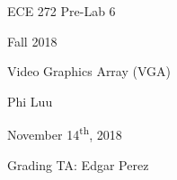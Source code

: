 \documentclass[12pt]{article}
\begin{document}
\begin{titlepage}
  \begin{center} \LARGE
    \vspace*{1.5in}

    ECE 272 Pre-Lab 6

    Fall 2018

    \vfill

    Video Graphics Array (VGA)

    Phi Luu

    \vfill

    November 14\textsuperscript{th}, 2018

    Grading TA: Edgar Perez

    \vspace{1.5in}
  \end{center}
\end{titlepage}
\end{document}
